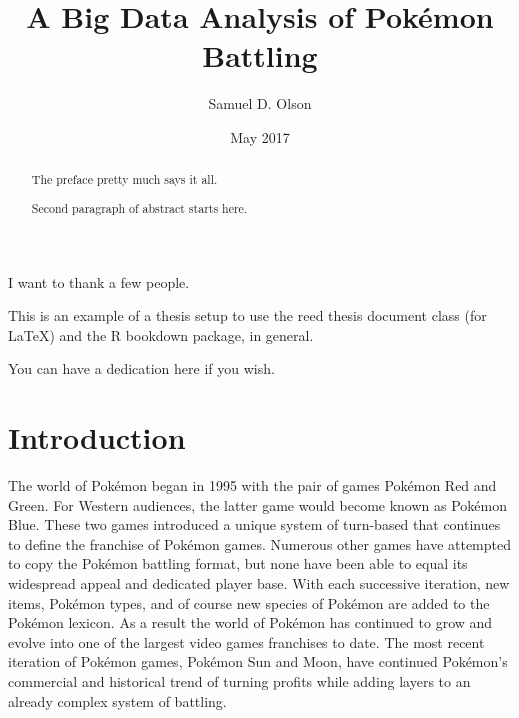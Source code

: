 \documentclass[12pt,twoside]{reedthesis}
\title{A Big Data Analysis of Pokémon Battling}
\author{Samuel D. Olson}
\date{May 2017}
\begin{document}
      \maketitle
  
  \frontmatter %
  \pagestyle{empty} %

      \begin{acknowledgements}
      I want to thank a few people.
    \end{acknowledgements}
  
      \begin{preface}
      This is an example of a thesis setup to use the reed thesis document
      class (for LaTeX) and the R bookdown package, in general.
    \end{preface}
  
      \hypersetup{linkcolor=black}
    \setcounter{tocdepth}{2}
    \tableofcontents
  
      \listoftables
  
      \listoffigures
  
      \begin{abstract}
      The preface pretty much says it all. \par  Second paragraph of abstract
      starts here.
    \end{abstract}
  
      \begin{dedication}
      You can have a dedication here if you wish.
    \end{dedication}
  
  \mainmatter %
  \pagestyle{fancyplain} %

  \chapter{Introduction}\label{introduction}
  
  The world of Pokémon began in 1995 with the pair of games Pokémon Red
  and Green. For Western audiences, the latter game would become known as
  Pokémon Blue. These two games introduced a unique system of turn-based
  that continues to define the franchise of Pokémon games. Numerous other
  games have attempted to copy the Pokémon battling format, but none have
  been able to equal its widespread appeal and dedicated player base. With
  each successive iteration, new items, Pokémon types, and of course new
  species of Pokémon are added to the Pokémon lexicon. As a result the
  world of Pokémon has continued to grow and evolve into one of the
  largest video games franchises to date. The most recent iteration of
  Pokémon games, Pokémon Sun and Moon, have continued Pokémon's commercial
  and historical trend of turning profits while adding layers to an
  already complex system of battling.
  
\end{document}
